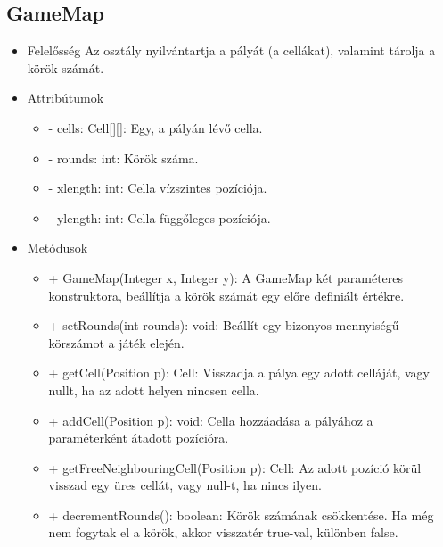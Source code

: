\subsection{GameMap}
\begin{itemize}
\item Felelősség\newline
Az osztály nyilvántartja a pályát (a cellákat), valamint tárolja a körök számát.

\item Attribútumok
	\begin{itemize}
		\item - cells: Cell[][]: Egy, a pályán lévő cella.
		\item - rounds: int: Körök száma.
		\item - xlength: int: Cella vízszintes pozíciója.
		\item - ylength: int: Cella függőleges pozíciója.
	\end{itemize}
\item Metódusok
	\begin{itemize}
		\item + GameMap(Integer x, Integer y):  A GameMap két paraméteres konstruktora, beállítja a körök számát egy előre definiált értékre.
		\item + setRounds(int rounds): void: Beállít egy bizonyos mennyiségű körszámot a játék elején.
		\item + getCell(Position p): Cell: Visszadja a pálya egy adott celláját, vagy nullt, ha az adott helyen nincsen cella.
		\item + addCell(Position p): void: Cella hozzáadása a pályához a paraméterként átadott pozícióra.
		\item + getFreeNeighbouringCell(Position p): Cell: Az adott pozíció körül visszad egy üres cellát, vagy null-t, ha nincs ilyen.
		\item + decrementRounds(): boolean: Körök számának csökkentése. Ha még nem fogytak el a körök, akkor visszatér true-val, különben false. 
	\end{itemize}
\end{itemize}

